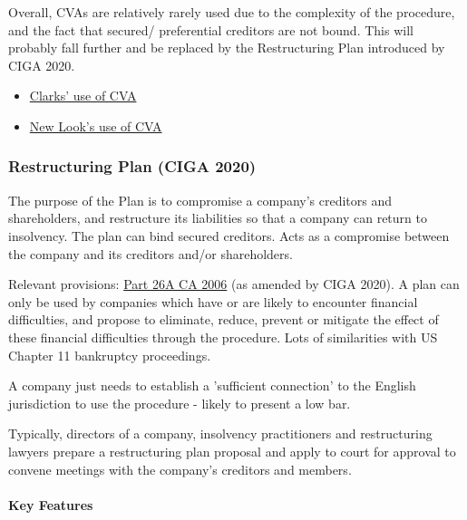 \documentclass[
]{article}
\providecommand{\tightlist}{%
  \setlength{\itemsep}{0pt}\setlength{\parskip}{0pt}}
\begin{document}
Overall, CVAs are relatively rarely used due to the complexity of the
procedure, and the fact that secured/ preferential creditors are not
bound. This will probably fall further and be replaced by the
Restructuring Plan introduced by CIGA 2020.

\begin{itemize}
\tightlist
\item
  \href{https://www.theguardian.com/business/2020/nov/20/landlords-accuse-clarks-over-legal-deal-to-cut-shop-rents}{Clarks'
  use of CVA}
\item
  \href{https://www.theguardian.com/business/2020/sep/15/new-look-strikes-deal-on-rent-cuts-and-payment-holidays}{New
  Look's use of CVA}
\end{itemize}

\hypertarget{restructuring-plan-ciga-2020}{%
\subsubsection{Restructuring Plan (CIGA
2020)}\label{restructuring-plan-ciga-2020}}

The purpose of the Plan is to compromise a company's creditors and
shareholders, and restructure its liabilities so that a company can
return to insolvency. The plan can bind secured creditors. Acts as a
compromise between the company and its creditors and/or shareholders.

Relevant provisions:
\href{https://www.legislation.gov.uk/ukpga/2006/46/part/26A}{Part 26A CA
2006} (as amended by CIGA 2020). A plan can only be used by companies
which have or are likely to encounter financial difficulties, and
propose to eliminate, reduce, prevent or mitigate the effect of these
financial difficulties through the procedure. Lots of similarities with
US Chapter 11 bankruptcy proceedings.

A company just needs to establish a 'sufficient connection' to the
English jurisdiction to use the procedure - likely to present a low bar.

Typically, directors of a company, insolvency practitioners and
restructuring lawyers prepare a restructuring plan proposal and apply to
court for approval to convene meetings with the company's creditors and
members.

\hypertarget{key-features}{%
\paragraph{Key Features}\label{key-features}}
\end{document}

